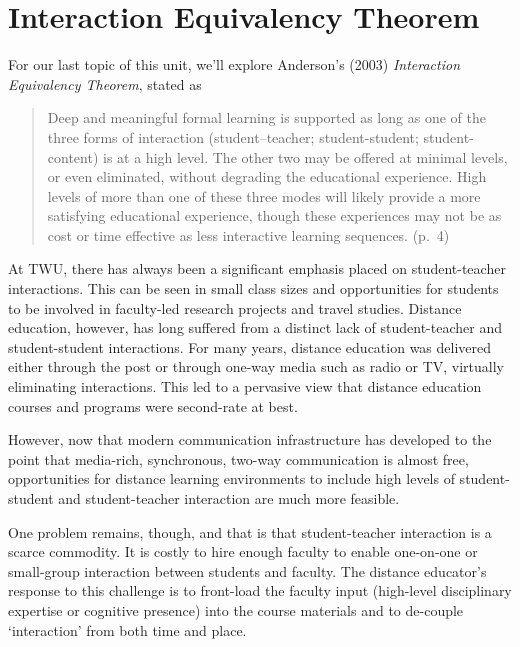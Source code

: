 \documentclass[
]{book}
\begin{document}
\hypertarget{interaction-equivalency-theorem}{%
\section{Interaction Equivalency Theorem}\label{interaction-equivalency-theorem}}

For our last topic of this unit, we'll explore Anderson's (2003) \emph{Interaction Equivalency Theorem}, stated as

\begin{quote}
Deep and meaningful formal learning is supported as long as one of the three forms of interaction (student--teacher; student-student; student-content) is at a high level. The other two may be offered at minimal levels, or even eliminated, without degrading the educational experience.
High levels of more than one of these three modes will likely provide a more satisfying educational experience, though these experiences may not be as cost or time effective as less interactive learning sequences. (p.~4)
\end{quote}

At TWU, there has always been a significant emphasis placed on student-teacher interactions. This can be seen in small class sizes and opportunities for students to be involved in faculty-led research projects and travel studies. Distance education, however, has long suffered from a distinct lack of student-teacher and student-student interactions. For many years, distance education was delivered either through the post or through one-way media such as radio or TV, virtually eliminating interactions. This led to a pervasive view that distance education courses and programs were second-rate at best.

However, now that modern communication infrastructure has developed to the point that media-rich, synchronous, two-way communication is almost free, opportunities for distance learning environments to include high levels of student-student and student-teacher interaction are much more feasible.

One problem remains, though, and that is that student-teacher interaction is a scarce commodity. It is costly to hire enough faculty to enable one-on-one or small-group interaction between students and faculty. The distance educator's response to this challenge is to front-load the faculty input (high-level disciplinary expertise or cognitive presence) into the course materials and to de-couple `interaction' from both time and place.
\end{document}
